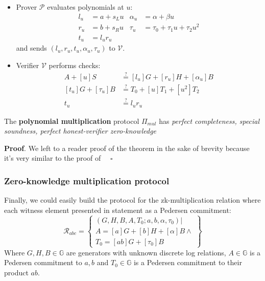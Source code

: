 \documentclass[../lecture-notes-148x210.tex]{subfiles}
\begin{document}
\begin{definition}
\begin{itemize}
\begin{itemize}
                \item Prover $\mathcal{P}$ evaluates polynomials at $u$:
                    \begin{equation}
                        \begin{aligned}
                            l_u & = a + s_L u & \alpha_u &= \alpha + \beta u\\
                            r_u &= b + s_R u & \tau_u &= \tau_0 + \tau_1 u + \tau_2 u^2\\
                            t_u &= l_u r_u & 
                        \end{aligned}
                    \end{equation}
                    and sends $(l_u, r_u, t_u, \alpha_u, \tau_u)$ to $\mathcal{V}$.
                \item Verifier $\mathcal{V}$ performs checks: 
                    \begin{equation}
                        \begin{aligned}
                            A + [u]S &\stackrel{\text{?}}{=} [l_u]G + [r_u]H + [\alpha_u]B \\
                            [t_u]G + [\tau_u]B &\stackrel{\text{?}}{=} T_0 + [u]T_1 + [u^2]T_2 \\
                            t_u &\stackrel{\text{?}}{=} l_u r_u
                        \end{aligned}
                    \end{equation}
            \end{itemize}
    \end{itemize}
\end{definition}

\begin{theorem}
    The \textbf{polynomial multiplication} protocol $\Pi_{mul}$ has \textit{perfect completeness, special soundness, perfect honest-verifier zero-knowledge}
    \label{th:poly_mul}
\end{theorem}
\textbf{Proof}. We left to a reader proof of the theorem in the sake of brevity because it's very similar to the proof of  $\quad \square$

\subsubsection{Zero-knowledge multiplication protocol}

Finally, we could easily build the protocol for the zk-multiplication relation where each witness element presented in statement as a Pedersen commitment: 
$$\mathcal{R}_{abc} = \left\{\begin{array}{l}
    (G,H,B,A,T_0;a,b, \alpha, \tau_0) \vert \\
    A = [a]G + [b]H + [\alpha]B \wedge \\
    T_0 = [ab]G + [\tau_0]B 
\end{array}\right\}$$
Where $G,H,B \in \mathbb{G}$ are generators with unknown discrete log relations, $A \in \mathbb{G}$ is a Pedersen commitment to $a,b$ and $T_0 \in \mathbb{G}$ is a Pedersen commitment to their product $ab$.
\end{document}
